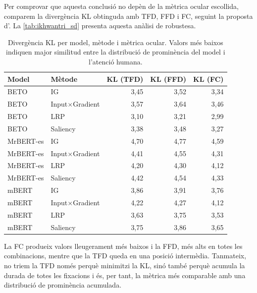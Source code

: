 Per comprovar que aquesta conclusió no depèn de la mètrica ocular escollida, comparem la divergència KL obtinguda amb TFD, FFD i FC, seguint la proposta d'\textcite{ikhwantriLookingDeepEyes2023}.
La \autoref{tab:ikhwantri_sd} presenta aquesta anàlisi de robustesa.
\iftables
\begin{table}[!ht]
\small
\centering
\begin{tabular}{llrrr}
\toprule
\textbf{Model} & \textbf{Mètode} & \textbf{KL (TFD)} & \textbf{KL (FFD)} & \textbf{KL (FC)} \\
\midrule
BETO & IG & 3,45 & 3,52 & 3,34 \\
BETO & Input$\times$Gradient & 3,57 & 3,64 & 3,46 \\
BETO & LRP & 3,10 & 3,21 & 2,99 \\
BETO & Saliency & 3,38 & 3,48 & 3,27 \\
MrBERT-es & IG & 4,70 & 4,77 & 4,59 \\
MrBERT-es & Input$\times$Gradient & 4,41 & 4,55 & 4,31 \\
MrBERT-es & LRP & 4,20 & 4,30 & 4,12 \\
MrBERT-es & Saliency & 4,42 & 4,54 & 4,33 \\
mBERT & IG & 3,86 & 3,91 & 3,76 \\
mBERT & Input$\times$Gradient & 4,22 & 4,27 & 4,12 \\
mBERT & LRP & 3,63 & 3,75 & 3,53 \\
mBERT & Saliency & 3,75 & 3,86 & 3,65 \\
\bottomrule
\end{tabular}
\caption{Divergència KL per model, mètode i mètrica ocular. Valors més baixos indiquen major similitud entre la distribució de prominència del model i l'atenció humana.}
\label{tab:ikhwantri_sd}
\end{table}
\fi

La FC produeix valors lleugerament més baixos i la FFD, més alts en totes les combinacions, mentre que la TFD queda en una posició intermèdia.
Tanmateix, no triem la TFD només perquè minimitzi la KL, sinó també perquè acumula la durada de totes les fixacions i és, per tant, la mètrica més comparable amb una distribució de prominència acumulada.

